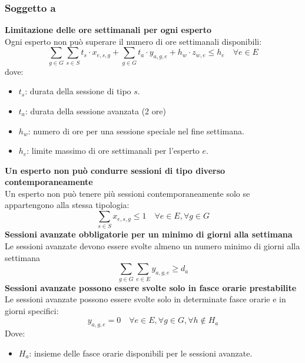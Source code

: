 \documentclass[12pt]{article}
\begin{document}
    \subsubsection{Soggetto a}
    \textbf{Limitazione delle ore settimanali per ogni esperto}\\
    Ogni esperto non può superare il numero di ore settimanali disponibili:
    \begin{equation}
        \sum_{g \in G}\sum_{s \in S} t_s \cdot x_{e,s,g} + \sum_{g \in G} t_a \cdot y_{a,g,e} + h_w \cdot z_{w,e} \leq h_{e} \quad \forall e \in E
    \end{equation}
    dove:
    \begin{itemize}
        \item $t_s$: durata della sessione di tipo $s$.
        \item $t_a$: durata della sessione avanzata (2 ore)
        \item $h_w$: numero di ore per una sessione speciale nel fine settimana.
        \item $h_e$: limite massimo di ore settimanali per l'esperto $e$.
    \end{itemize}
    \textbf{Un esperto non può condurre sessioni di tipo diverso contemporaneamente}\\
    Un esperto non può tenere più sessioni contemporaneamente solo se appartengono alla stessa tipologia:
    \begin{equation}
        \sum_{s \in S} x_{e,s,g} \leq 1 \quad \forall e \in E, \forall g \in G
    \end{equation}
    \textbf{Sessioni avanzate obbligatorie per un minimo di giorni alla settimana}\\
    Le sessioni avanzate devono essere svolte almeno un numero minimo di giorni alla settimana
    \begin{equation}
        \sum_{g \in G} \sum_{e \in E} y_{a,g,e} \geq d_a
    \end{equation}
    \textbf{Sessioni avanzate possono essere svolte solo in fasce orarie prestabilite}\\
    Le sessioni avanzate possono essere svolte solo in determinate fasce orarie e in giorni specifici:
    \begin{equation}
        y_{a,g,e} = 0 \quad \forall e \in E, \forall g \in G, \forall h \notin H_a
    \end{equation}
    Dove:
    \begin{itemize}
        \item $H_a$: insieme delle fasce orarie disponibili per le sessioni avanzate.
    \end{itemize}
\end{document}
